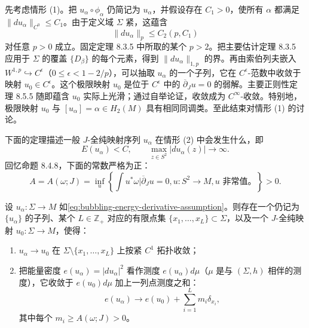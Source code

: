 先考虑情形 (1)。把 $u_\alpha\circ\phi_\alpha$ 仍简记为 $u_\alpha$，并假设存在 $C_1>0$，使所有 $\alpha$ 都满足
$\|du_\alpha\|_{C^0}\leq C_1$。由于定义域 $\Sigma$ 紧，这蕴含
\[
 \|du_\alpha\|_p\leq C_2(p,C_1)
\]
对任意 $p>0$ 成立。固定定理 8.3.5 中所取的某个 $p>2$。把主要估计定理 8.3.5 应用于 $\Sigma$ 的覆盖 $\{D_\beta\}$ 的每个元素，得到
$\|du_\alpha\|_{1,p}$ 的界。再由索伯列夫嵌入
$W^{1,p}\hookrightarrow C^\epsilon$（$0\leq\epsilon<1-2/p$），可以抽取 $u_\alpha$ 的一个子列，它在 $C^\epsilon$-范数中收敛于映射 $u_0\in C^\epsilon$。这个极限映射 $u_0$ 是位于 $C^\epsilon$ 中的 $\overline\partial_Ju=0$ 的弱解。主要正则性定理 8.5.5 随即蕴含 $u_0$ 实际上光滑；通过自举论证，收敛成为 $C^\infty$-收敛。特别地，极限映射 $u_0$ 与
$[u_\alpha]=\alpha\in H_2(M)$ 具有相同同调类。至此结束对情形 (1) 的讨论。

下面的定理描述一般 $J$-全纯映射序列 $u_\alpha$ 在情形 (2) 中会发生什么，即
\begin{equation}
 E(u_\alpha)<C,
 \qquad \max_{z\in S^2}|du_\alpha(z)|\longrightarrow\infty.
 \label{eq:bubbling-energy-derivative-assumption}
\end{equation}
回忆命题 8.4.8，下面的常数严格为正：
\[
 A=A(\omega;J)
 =\inf_u\left\{\int u^*\omega\mathrel{\Big|}
 \overline\partial_Ju=0, u:S^2\to M, u\text{ 非常值。}\right\}>0.
\]

\begin{theorem}\label{thm:bubbling-measure-convergence}
设 $u_\alpha:\Sigma\to M$ 如\eqref{eq:bubbling-energy-derivative-assumption}。则存在一个仍记为 $\{u_\alpha\}$ 的子列、某个 $L\in\mathbb Z_+$ 对应的有限点集
$\{x_1,\ldots,x_L\}\subset\Sigma$，以及一个 $J$-全纯映射
$u_0:\Sigma\to M$，使得：
\begin{enumerate}[label=(\arabic*)]
 \item $u_\alpha\to u_0$ 在
 $\Sigma\setminus\{x_1,\ldots,x_L\}$ 上按紧 $C^1$ 拓扑收敛；
 \item 把能量密度 $e(u_\alpha)=|du_\alpha|^2$ 看作测度
 $e(u_\alpha)d\mu$（$\mu$ 是与 $(\Sigma,h)$ 相伴的测度），它收敛于 $e(u_0)d\mu$ 加上一列点测度之和：
 \[
  e(u_\alpha)\longrightarrow e(u_0)+\sum_{i=1}^Lm_i\delta_{x_i},
 \]
 其中每个 $m_i\geq A(\omega;J)>0$。
\end{enumerate}
\end{theorem}

